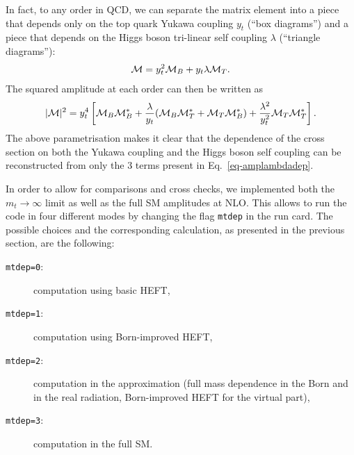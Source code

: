 In fact, to any order in QCD, we can separate the matrix element into a 
piece that depends only on the top quark Yukawa coupling $y_t$ (``box diagrams'') and a 
piece that depends on the Higgs boson tri-linear self coupling $\lambda$ (``triangle diagrams''):
\begin{align}
{\cal M} = y_t^2 {\cal M}_B + y_t \lambda {\cal M}_T.
\end{align}
The squared amplitude at each order can then be written as
\begin{align}
|{\cal M}|^2 = y_t^4 \left[ {\cal M}_B {\cal M}_B^* + \frac{\lambda}{y_t} ({\cal M}_B {\cal M}_T^* + {\cal M}_T {\cal M}_B^* ) +  \frac{\lambda^2}{y_t^2} {\cal M}_T {\cal M}_T^*  \right].
\end{align}
The above parametrisation makes it clear that the dependence of the cross section on
both the Yukawa coupling and the Higgs boson self coupling can be reconstructed
from only the 3 terms present in Eq.~\ref{eq-amplambdadep}.

In order to allow for comparisons and cross checks, we implemented
both the $m_t\to\infty$ limit as well as the full SM amplitudes at
NLO. This allows to run the code in four different modes by changing
the flag {\tt mtdep} in the \powhegbox{} run card. The possible
choices and the corresponding calculation, as presented in the
previous section, are the following:
\begin{description}
 \item[{\tt mtdep=0}:]{computation using basic HEFT,}
 \item[{\tt mtdep=1}:]{computation using Born-improved HEFT,}
 \item[{\tt mtdep=2}:]{computation in the approximation \ftapprox (full
   mass dependence in the Born and in the real radiation, Born-improved HEFT
   for the virtual part),}
 \item[{\tt mtdep=3}:]{computation in the full SM.}
\end{description}

\vspace*{1cm}


